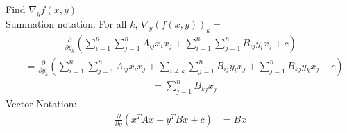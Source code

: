 \documentclass{article}
\begin{document}
\begin{aprob}
\begin{tcolorbox}[colback=lightgray!10!white, colframe=black, title=A7.c]
    Find $\nabla_y f(x,y)$ \\
    Summation notation: For all $k$, $\nabla_y(f(x,y))_k = $ \\
    \begin{align*}
    \frac{\partial}{\partial y_k} \left( \sum_{i=1}^n \sum_{j=1}^n A_{ij} x_i x_j + \sum_{i=1}^n \sum_{j=1}^n B_{ij} y_i x_j + c \right)
    \end{align*}
    \begin{align*}
    &= \frac{\partial}{\partial y_k} \left( \sum_{i=1}^n \sum_{j=1}^n A_{ij} x_i x_j + \sum_{i \neq k} \sum_{j=1}^n B_{ij} y_i x_j + \sum_{j=1}^n B_{kj} y_k x_j + c \right)
    \end{align*}
    \begin{align*}
    &= \sum_{j=1}^n B_{kj} x_j
    \end{align*}
    Vector Notation:
    \begin{align*}
    \frac{\partial}{\partial y} (x^T A x + y^T B x + c)
    &= B x
    \end{align*}
    \end{tcolorbox}
\end{aprob}
\end{document}

